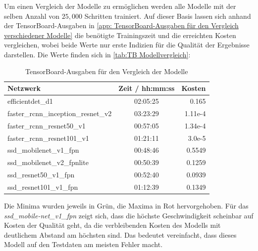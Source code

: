 \documentclass[12pt, oneside]{article}
\begin{document}
Um einen Vergleich der Modelle zu ermöglichen werden alle Modelle mit der selben Anzahl von $25,000$ Schritten trainiert. Auf dieser Basis lassen sich anhand der TensorBoard-Ausgaben in \autoref{app: TensorBoard-Ausgaben für den Vergleich verschiedener Modelle} die benötigte Trainingszeit und die erreichten Kosten vergleichen, wobei beide Werte nur erste Indizien für die Qualität der Ergebnisse darstellen. Die Werte finden sich in \autoref{tab:TB Modellvergleich}:
\begin{table}[ht]
	\centering
	\caption{TensorBoard-Ausgaben für den Vergleich der Modelle}
	\label{tab:TB Modellvergleich}
	\begin{tabular}{|l|c|r|}
		\hline
		\textbf{Netzwerk}                            & \textbf{Zeit / hh:mm:ss}         & \textbf{Kosten}                \\ \hline
		efficientdet\_d1                             & 02:05:25                         & 0.165                          \\ \hline
		faster\_rcnn\_inception\_resnet\_v2 & \cellcolor[HTML]{FE0000}03:23:29 & 1.11e-4                        \\ \hline
		faster\_rcnn\_resnet50\_v1          & 00:57:05                         & 1.34e-4                        \\ \hline
		faster\_rcnn\_resnet101\_v1         & 01:21:11                         & \cellcolor[HTML]{34FF34}3.0e-5 \\ \hline
		ssd\_mobilenet\_v1\_fpn             & \cellcolor[HTML]{34FF34}00:48:46 & \cellcolor[HTML]{FE0000}0.5549 \\ \hline
		ssd\_mobilenet\_v2\_fpnlite         & 00:50:39                         & 0.1259                         \\ 
		\hline
		ssd\_resnet50\_v1\_fpn              & 00:52:40                         & 0.0939                         \\ \hline
		ssd\_resnet101\_v1\_fpn             & 01:12:39                         & 0.1349                         \\ \hline
	\end{tabular}
\end{table}
Die Minima wurden jeweils in Grün, die Maxima in Rot hervorgehoben. Für das \textit{ssd\_mobile-net\_v1\_fpn} zeigt sich, dass die höchste Geschwindigkeit scheinbar auf Kosten der Qualität geht, da die verbleibenden Kosten des Modells mit deutlichem Abstand am höchsten sind. Das bedeutet vereinfacht, dass dieses Modell auf den Testdaten am meisten Fehler macht.
\end{document}
